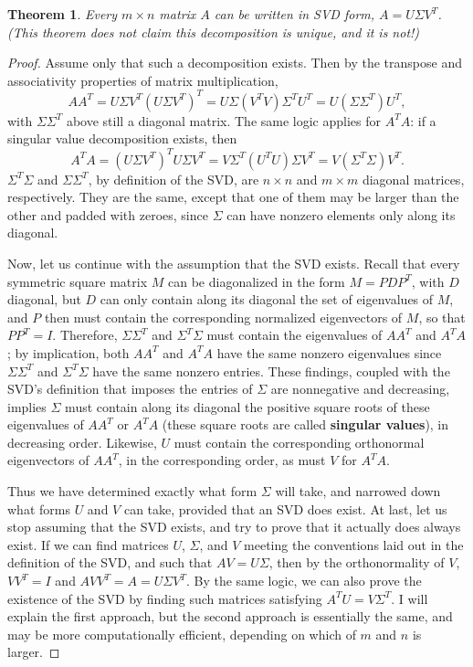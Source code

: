 \documentclass[draft,12pt]{report}
\newtheorem{theorem}{Theorem}
\begin{document}
\begin{theorem}
    Every $m \times n$ matrix $A$ can be written in SVD form, $A = U\Sigma V^T$. (This theorem does not claim this decomposition is unique, and it is not!)
\end{theorem}
\begin{proof}
    Assume only that such a decomposition exists. Then by the transpose and associativity properties of matrix multiplication,
    \[ AA^T = U\Sigma V^T \left( U\Sigma V^T \right)^T = U\Sigma \left( V^T V \right) \Sigma^T U^T = U \left( \Sigma \Sigma^T \right) U^T, \]
    with $\Sigma \Sigma^T$ above still a diagonal matrix. The same logic applies for $A^TA$: if a singular value decomposition exists, then
    \[ A^TA = \left( U\Sigma V^T \right)^T U\Sigma V^T = V\Sigma^T \left( U^T U \right) \Sigma V^T = V \left( \Sigma^T \Sigma \right) V^T. \]
    $\Sigma^T \Sigma$ and $\Sigma \Sigma^T$, by definition of the SVD, are $n \times n$ and $m \times m$ diagonal matrices, respectively. They are the same, except that one of them may be larger than the other and padded with zeroes, since $\Sigma$ can have nonzero elements only along its diagonal.
    
    Now, let us continue with the assumption that the SVD exists. Recall that every symmetric square matrix $M$ can be diagonalized in the form $M = PDP^T$, with $D$ diagonal, but $D$ can only contain along its diagonal the set of eigenvalues of $M$, and $P$ then must contain the corresponding normalized eigenvectors of $M$, so that $PP^T = I$. Therefore, $\Sigma \Sigma^T$ and $\Sigma^T \Sigma$ must contain the eigenvalues of $AA^T$ and $A^TA$; by implication, both $AA^T$ and $A^TA$ have the same nonzero eigenvalues since $\Sigma \Sigma^T$ and $\Sigma^T \Sigma$ have the same nonzero entries. These findings, coupled with the SVD's definition that imposes the entries of $\Sigma$ are nonnegative and decreasing, implies $\Sigma$ must contain along its diagonal the positive square roots of these eigenvalues of $AA^T$ or $A^TA$ (these square roots are called \textbf{singular values}), in decreasing order. Likewise, $U$ must contain the corresponding orthonormal eigenvectors of $AA^T$, in the corresponding order, as must $V$ for $A^TA$.
    
    Thus we have determined exactly what form $\Sigma$ will take, and narrowed down what forms $U$ and $V$ can take, provided that an SVD does exist. At last, let us stop assuming that the SVD exists, and try to prove that it actually does always exist. If we can find matrices $U$, $\Sigma$, and $V$ meeting the conventions laid out in the definition of the SVD, and such that $AV = U\Sigma$, then by the orthonormality of $V$, $VV^T = I$ and $AVV^T = A = U\Sigma V^T$. By the same logic, we can also prove the existence of the SVD by finding such matrices satisfying $A^TU = V\Sigma^T$. I will explain the first approach, but the second approach is essentially the same, and may be more computationally efficient, depending on which of $m$ and $n$ is larger.
    

\end{proof}
\end{document}

